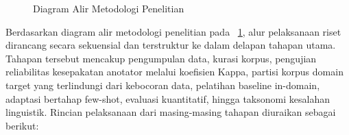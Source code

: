 \begin{figure}[H]
\caption{Diagram Alir Metodologi Penelitian}
\label{fig:alur_penelitian}
\end{figure}

Berdasarkan diagram alir metodologi penelitian pada \figurename~\ref{fig:alur_penelitian}, alur pelaksanaan riset dirancang secara sekuensial dan terstruktur ke dalam delapan tahapan utama. Tahapan tersebut mencakup pengumpulan data, kurasi korpus, pengujian reliabilitas kesepakatan anotator melalui koefisien Kappa, partisi korpus domain target yang terlindungi dari kebocoran data, pelatihan baseline in-domain, adaptasi bertahap few-shot, evaluasi kuantitatif, hingga taksonomi kesalahan linguistik. Rincian pelaksanaan dari masing-masing tahapan diuraikan sebagai berikut:
